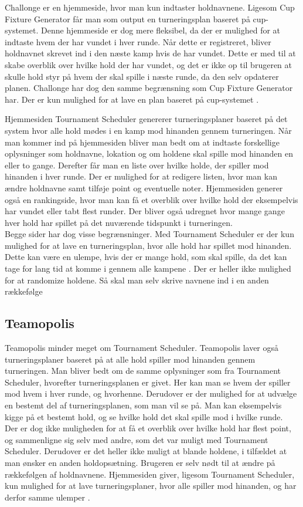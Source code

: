 Challonge er en hjemmeside, hvor man kun indtaster holdnavnene. Ligesom Cup Fixture Generator får man som output en turneringsplan baseret på cup-systemet. Denne hjemmeside er dog mere fleksibel, da der er mulighed for at indtaste hvem der har vundet i hver runde. Når dette er registreret, bliver holdnavnet skrevet ind i den næste kamp hvis de har vundet. Dette er med til at skabe overblik over hvilke hold der har vundet, og det er ikke op til brugeren at skulle hold styr på hvem der skal spille i næste runde, da den selv opdaterer planen. Challonge har dog den samme begrænsning som Cup Fixture Generator har. Der er kun mulighed for at lave en plan baseret på cup-systemet \citep{challonge}. 

Hjemmesiden Tournament Scheduler genererer turneringsplaner baseret på det system hvor alle hold mødes i en kamp mod hinanden gennem turneringen. Når man kommer ind på hjemmesiden bliver man bedt om at indtaste forskellige oplysninger som holdnavne, lokation og om holdene skal spille mod hinanden en eller to gange. Derefter får man en liste over hvilke holde, der spiller mod hinanden i hver runde. Der er mulighed for at redigere listen, hvor man kan ændre holdnavne samt tilføje point og eventuelle noter. Hjemmesiden generer også en rankingside, hvor man kan få et overblik over hvilke hold der eksempelvis har vundet eller tabt flest runder. Der bliver også udregnet hvor mange gange hver hold har spillet på det nuværende tidspunkt i turneringen.\\
Begge sider har dog visse begrænsninger. Med Tournament Scheduler er der kun mulighed for at lave en turneringsplan, hvor alle hold har spillet mod hinanden. Dette kan være en ulempe, hvis der er mange hold, som skal spille, da det kan tage for lang tid at komme i gennem alle kampene \citep{TournamentScheduler}.
Der er heller ikke mulighed for at randomize holdene. Så skal man selv skrive navnene ind i en anden rækkefølge

\subsection*{Teamopolis}
Teamopolis minder meget om Tournament Scheduler. Teamopolis laver også turneringsplaner baseret på at alle hold spiller mod hinanden gennem turneringen. Man bliver bedt om de samme oplysninger som fra Tournament Scheduler, hvorefter turneringsplanen er givet. Her kan man se hvem der spiller mod hvem i hver runde, og hvorhenne. Derudover er der mulighed for at udvælge en bestemt del af turneringsplanen, som man vil se på. Man kan eksempelvis kigge på et bestemt hold, og se hvilke hold det skal spille mod i hvilke runde.\\
Der er dog ikke muligheden for at få et overblik over hvilke hold har flest point, og sammenligne sig selv med andre, som det var muligt med Tournament Scheduler. Derudover er det heller ikke muligt at blande holdene, i tilfældet at man ønsker en anden holdopsætning. Brugeren er selv nødt til at ændre på rækkefølgen af holdnavnene. Hjemmesiden giver, ligesom Tournament Scheduler, kun mulighed for at lave turneringsplaner, hvor alle spiller mod hinanden, og har derfor samme ulemper \citep{Teamopolis}.




